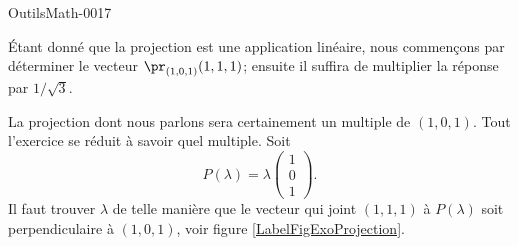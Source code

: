 
\begin{corrige}{OutilsMath-0017}

	\newcommand{\CaptionFigExoProjection}{Pour l'exercice \ref{exoOutilsMath-0017}. À partir du point $A$, il faut trouver quel vecteur tombe perpendiculairement à la droite contenant $w$.}


Étant donné que la projection est une application linéaire, nous commençons par déterminer le vecteur \( \pr_{(1,0,1)}(1,1,1)\); ensuite il suffira de multiplier la réponse par \( 1/\sqrt{3}\).

	La projection dont nous parlons sera certainement un multiple de $(1,0,1)$. Tout l'exercice se réduit à savoir quel multiple. Soit
	\begin{equation}
		P(\lambda)=\lambda\begin{pmatrix}
			1	\\ 
			0	\\ 
			1	
		\end{pmatrix}.
	\end{equation}
	Il faut trouver $\lambda$ de telle manière que le vecteur qui joint $(1,1,1)$ à $P(\lambda)$ soit perpendiculaire à $(1,0,1)$, voir figure \ref{LabelFigExoProjection}.
	

\end{corrige}
